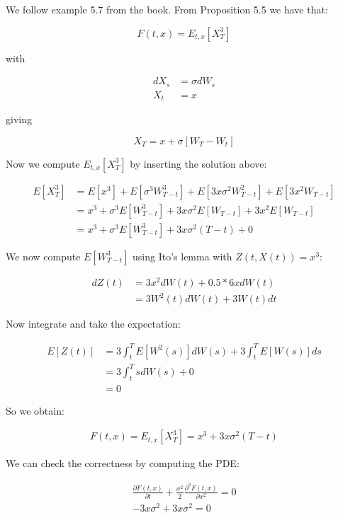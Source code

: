 \documentclass[11pt,a4paper,onecolumn]{article}
\begin{document}
We follow example 5.7 from the book. From Proposition 5.5 we have that:

\begin{equation*}
  F(t,x) = E_{t,x}[X^3_T]
\end{equation*}

with

\begin{align*}
  dX_s &= \sigma dW_s \\
  X_t &= x
\end{align*}

giving

\begin{equation*}
  X_T = x + \sigma[W_T - W_t]
\end{equation*}

Now we compute $E_{t,x}[X^3_T]$ by inserting the solution above:

\begin{align*}
  E[X_T^3] &= E[x^3] + E[\sigma^3W^3_{T-t}] + E[3x\sigma^2W_{T-t}^2] + E[3x^2W_{T-t}] \\
  &= x^3 + \sigma^3E[W^3_{T-t}] + 3x\sigma^2E[W_{T-t}] + 3x^2E[W_{T-t}] \\
  &= x^3 + \sigma^3E[W^3_{T-t}] + 3x\sigma^2(T-t) + 0
\end{align*}

We now compute $E[W^3_{T-t}]$ using Ito's lemma with $Z(t,X(t)) = x^3$:

\begin{align*}
  dZ(t) &= 3x^2dW(t) + 0.5 * 6xdW(t) \\
  &= 3W^2(t)dW(t) + 3W(t)dt
\end{align*}

Now integrate and take the expectation:

\begin{align*}
  E[Z(t)] &= 3\int^T_tE[W^2(s)]dW(s) + 3\int_t^TE[W(s)]ds\\
  &= 3\int_t^TsdW(s) + 0\\
  &= 0
\end{align*}

So we obtain:

\begin{align*}
  F(t,x) = E_{t,x}[X_T^3] = x^3 + 3x\sigma^2(T-t)
\end{align*}

We can check the correctness by computing the PDE:

\begin{align*}
  \frac{\partial F(t,x)}{\partial t} + \frac{\sigma^2}{2}\frac{\partial^2F(t,x)}{\partial x^2} = 0 \\
  -3x\sigma^2 + 3x\sigma^2 = 0
\end{align*}
\end{document}
